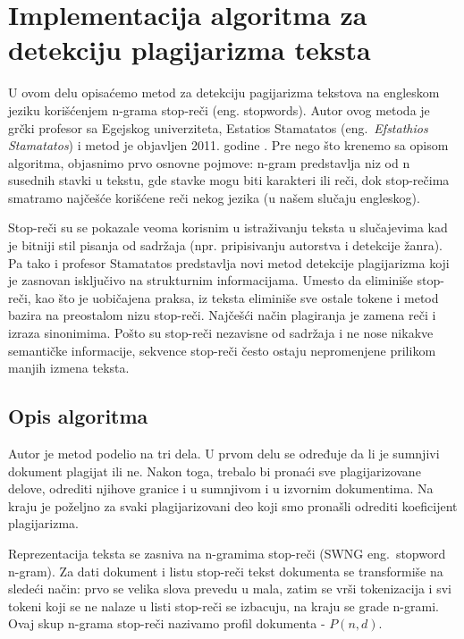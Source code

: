 \documentclass[a4paper]{article}
\begin{document}
\section{Implementacija algoritma za detekciju plagijarizma teksta}
\label{sec:implementacija algoritma za detekciju plagijarizma teksta}

U ovom delu opisaćemo metod za detekciju pagijarizma tekstova na engleskom jeziku korišćenjem n-grama stop-reči (eng. stopwords). Autor ovog metoda je grčki profesor sa Egejskog univerziteta, Estatios Stamatatos (eng.~{\em Efstathios Stamatatos}) i metod je objavljen 2011. godine \cite{stamatatos}. Pre nego što krenemo sa opisom algoritma, objasnimo prvo osnovne pojmove: n-gram predstavlja niz od n susednih stavki u tekstu, gde stavke mogu  biti karakteri ili reči, dok stop-rečima smatramo najčešće korišćene reči nekog  jezika (u našem slučaju engleskog).  

\par Stop-reči su se pokazale veoma korisnim u istraživanju teksta u slučajevima kad je  bitniji stil pisanja od sadržaja (npr. pripisivanju autorstva i detekcije žanra). Pa tako i profesor Stamatatos predstavlja novi metod detekcije plagijarizma  koji je zasnovan isključivo na strukturnim informacijama. Umesto da eliminiše  stop-reči, kao što je uobičajena praksa, iz teksta eliminiše sve ostale tokene i metod  bazira na preostalom nizu stop-reči. Najčešći način plagiranja je zamena reči i izraza sinonimima. Pošto su stop-reči nezavisne od sadržaja i ne nose nikakve  semantičke informacije, sekvence stop-reči često ostaju nepromenjene prilikom manjih izmena teksta.   

\subsection{Opis algoritma}
\label{subsec:opis algoritma}

Autor je metod podelio na tri dela. U prvom delu se određuje da li je sumnjivi dokument plagijat ili ne. Nakon toga, trebalo bi pronaći sve plagijarizovane delove, odrediti njihove granice i u sumnjivom i u izvornim dokumentima. Na kraju je poželjno  za svaki plagijarizovani deo koji smo pronašli odrediti koeficijent plagijarizma.\cite{stamatatos} 

\par Reprezentacija teksta se zasniva na n-gramima stop-reči (SWNG eng.~{stopword n-gram}). Za dati dokument i listu stop-reči tekst dokumenta se transformiše na sledeći način: prvo se velika slova  prevedu u mala, zatim se vrši tokenizacija i svi tokeni koji se ne nalaze u listi stop-reči se izbacuju, na kraju se grade n-grami. Ovaj skup n-grama stop-reči nazivamo profil dokumenta - \(P(n,d)\). 
\end{document}
